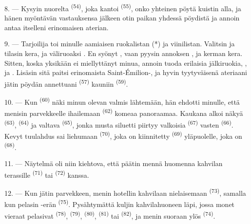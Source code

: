 8. --- Kysyin nuorelta  \textsuperscript{(54)}, joka
kantoi  \textsuperscript{(55)}, onko yhteinen pöytä kuistin
alla, ja hänen myöntävän vastauksensa jälkeen otin paikan yhdessä pöydistä ja
annoin antaa itselleni erinomaisen aterian.


\VUsaut{4.0mm}
\VUsaut{3.0mm}

9. --- Tarjoilija toi minulle aamiaisen ruokalistan (*) ja viinilistan. Valitsin
ja tilasin   kera, ja
väliruoaksi . En syönyt , vaan
pyysin annoksen , ja 
kerman kera. Sitten, koska yksikään  ei miellyttänyt minua,
annoin tuoda erilaisia jälkiruokia, ,  ja
. Lisäsin sitä paitsi erinomaista Saint-Émilion-,
ja hyvin tyytyväisenä ateriaani jätin pöydän annettuani 
\textsuperscript{(57)} kauniin  \textsuperscript{(59)}.

10. --- Kun  \textsuperscript{(60)} näki minun olevan valmis
lähtemään, hän ehdotti minulle, että menisin parvekkeelle ihailemaan
 \textsuperscript{(62)} komeaa panoraamaa. Kaukana alkoi
näkyä  \textsuperscript{(63)}, 
\textsuperscript{(64)} ja valtava  \textsuperscript{(65)},
jonka musta siluetti piirtyy valkoisia  \textsuperscript{(67)}
vasten  \textsuperscript{(66)}. Kevyt tuulahdus sai
liehumaan  \textsuperscript{(70)}, joka on kiinnitetty
 \textsuperscript{(69)} yläpuolelle, joka on 
\textsuperscript{(68)}.

\VUsaut{3.0mm}
\VUsaut{3.0mm}

11. --- Näytelmä oli niin kiehtova, että päätin mennä huomenna kahvilan
terassille  \textsuperscript{(71)} tai
 \textsuperscript{(72)} kanssa.

12. --- Kun jätin parvekkeen, menin hotellin kahvilaan nielaisemaan
 \textsuperscript{(73)}, samalla kun pelasin
-erän \textsuperscript{(75)}. Pysähtymättä kuljin
kahvilahuoneen läpi, jossa monet vieraat pelasivat 
\textsuperscript{(78)},  \textsuperscript{(79)},
 \textsuperscript{(80)}, 
\textsuperscript{(81)} tai  \textsuperscript{(82)}, ja menin
suoraan ylös  \textsuperscript{(74)}.

